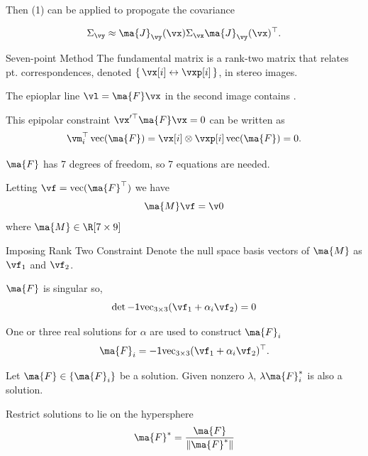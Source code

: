 \documentclass[8pt,aspectratio=169]{beamer}
\begin{document}

\begin{frame}
  Then (1) can be applied to propogate the covariance

  \begin{equation}
    \Sigma_{\vy} \approx \ma{J}_{\vy}(\vx)\Sigma_{\vx}\ma{J}_{\vy}(\vx)^{\T}.
  \end{equation}
\end{frame}

\begin{frame}[fragile]{Seven-point Method}
  The fundamental matrix \mF\xspace is a rank-two matrix that relates
  pt. correspondences, denoted $\{\,\cspond{\vx[i]}{\vxp[i]}\,\}$, in
  stereo images.
  \medskip

  The epioplar line $\vl = \ma{F}\vx$ in the second image contains \vxp.
  \medskip

  This epipolar constraint $\vx^{\prime \T} \ma{F} \vx=0$ can be
  written as
  \[
    \label{eq:billinear_form}
    \vm^{\T}_i \operatorname{vec}(\ma{F}) = \vx[i] \otimes \vxp[i]  \operatorname{vec}(\ma{F}) = 0.
    \]

  $\ma{F}$ has 7 degrees of freedom, so 7 equations are needed.
  \medskip  

  Letting $\vf = \operatorname{vec}(\ma{F}^{\T})$ we have
  \[
  \ma{M}\vf = \v0
  \]
  where $\ma{M} \in \R[7 \times 9]$
\end{frame}

\begin{frame}[fragile]{Imposing Rank Two Constraint}
  Denote the null space basis vectors of $\ma{M}$ as $\vf_1$ and $\vf_2$.
  \medskip
  
  $\ma{F}$ is singular so,
  \[\det \inv{\operatorname{vec}_{3\times3}} (\vf_1+\alpha_i \vf_2) = 0\]

  One or three real solutions for $\alpha$ are used to construct $\ma{F}_i$
  \begin{equation}
    \label{eq:estimateF}
    \ma{F}_i = \inv{\operatorname{vec}_{3\times3}} (\vf_1+\alpha_i \vf_2)^{\T}.
  \end{equation}

  Let $\ma{F} \in \{ \ma{F}_i \}$ be a solution.
  \medskip
  Given nonzero $\lambda$, $\lambda \ma{F}^{*}_i$ is also a solution.
  \medskip
  
  Restrict solutions to lie on the hypersphere
  \[
  \ma{F}^{*} = \frac{\ma{F}}{\| \ma{F}^{*} \|}
  \]
\end{frame}
\end{document}
